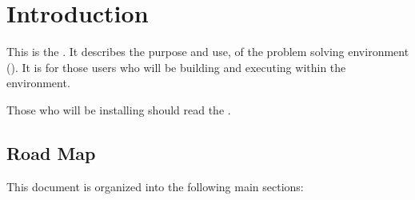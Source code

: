 %
%
%
%
%

%

\section{Introduction}
\label{sec:intro}


This is the \etitle{\srug}.  It describes the purpose and use, of the
\sr{} problem solving environment (\pse).  It is for those users who
will be building and executing  within the \sr{}
environment.

Those who will be installing \sr{} should read the
.




\subsection{Road Map}
\label{sec:roadmap}

This document is organized into the following main sections:

